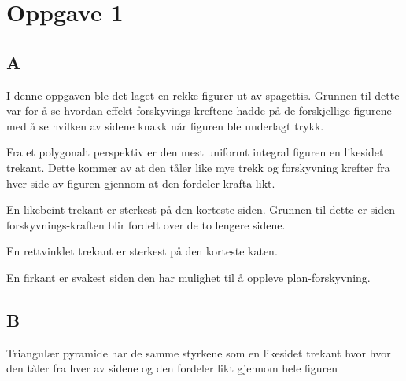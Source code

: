 \documentclass{report}
\begin{document}
\section{Oppgave 1}

\subsection{A}

I denne oppgaven ble det laget en rekke figurer ut av spagettis. Grunnen til dette var for å se hvordan effekt forskyvings kreftene hadde på de forskjellige figurene med å se hvilken av sidene knakk når figuren ble underlagt trykk.

Fra et polygonalt perspektiv er den mest uniformt integral figuren en likesidet trekant. Dette kommer av at den tåler like mye trekk og forskyvning krefter fra hver side av figuren gjennom at den fordeler krafta likt.

En likebeint trekant er sterkest på den korteste siden. Grunnen til dette er siden forskyvnings-kraften blir fordelt over de to lengere sidene.

En rettvinklet trekant er sterkest på den korteste katen.

En firkant er svakest siden den har mulighet til å oppleve plan-forskyvning.

\subsection{B}

Triangulær pyramide har de samme styrkene som en likesidet trekant hvor hvor den tåler fra hver av sidene og den fordeler likt gjennom hele figuren
\end{document}
